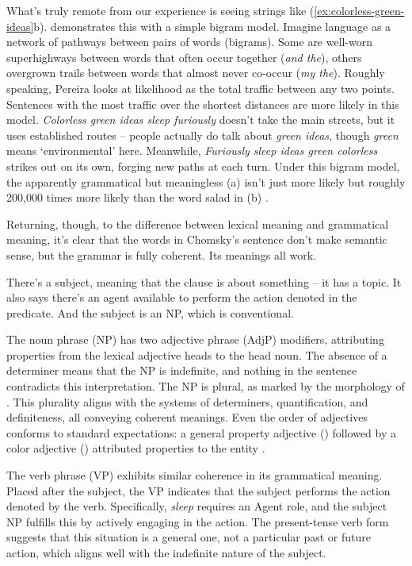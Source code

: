 What's truly remote from our experience is seeing strings like (\ref{ex:colorless-green-ideas}b). \citet{Pereira2000} demonstrates this with a simple bigram model. Imagine language as a network of pathways between pairs of words (bigrams). Some are well-worn superhighways between words that often occur together (\textit{and the}), others overgrown trails between words that almost never co-occur (\textit{my the}). Roughly speaking, Pereira looks at likelihood as the total traffic between any two points. Sentences with the most traffic over the shortest distances are more likely in this model. \textit{Colorless green ideas sleep furiously} doesn't take the main streets, but it uses established routes -- people actually do talk about \textit{green ideas}, though \textit{green} means `environmental' here. Meanwhile, \textit{Furiously sleep ideas green colorless} strikes out on its own, forging new paths at each turn. %
Under this bigram model, the apparently grammatical but meaningless (a) isn't just more likely but roughly 200,000 times more likely than the word salad in (b) \citep[7]{Pereira2000}.

Returning, though, to the difference between lexical meaning and grammatical meaning, it's clear that the words in Chomsky's sentence don't make semantic sense, but the grammar is fully coherent. Its meanings all work.

There's a subject, meaning that the clause is about something -- it has a topic. It also says there's an agent available to perform the action denoted in the predicate. And the subject is an NP, which is conventional.

The noun phrase (NP) has two adjective phrase (AdjP) modifiers, attributing properties from the lexical adjective heads to the head noun. The absence of a determiner means that the NP is indefinite, and nothing in the sentence contradicts this interpretation. The NP is plural, as marked by the morphology of . This plurality aligns with the systems of determiners, quantification, and definiteness, all conveying coherent meanings. Even the order of adjectives conforms to standard expectations: a general property adjective () followed by a color adjective () attributed properties to the entity .

The verb phrase (VP) exhibits similar coherence in its grammatical meaning. Placed after the subject, the VP indicates that the subject performs the action denoted by the verb. Specifically, \textit{sleep} requires an Agent role, and the subject NP fulfills this by actively engaging in the action. The present-tense verb form suggests that this situation is a general one, not a particular past or future action, which aligns well with the indefinite nature of the subject.

